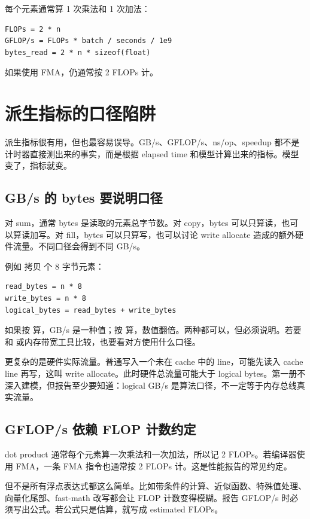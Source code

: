 每个元素通常算 1 次乘法和 1 次加法：

\begin{lstlisting}
FLOPs = 2 * n
GFLOP/s = FLOPs * batch / seconds / 1e9
bytes_read = 2 * n * sizeof(float)
\end{lstlisting}

如果使用 FMA，仍通常按 2 FLOPs 计。

\section{派生指标的口径陷阱}

派生指标很有用，但也最容易误导。GB/s、GFLOP/s、ns/op、speedup 都不是计时器直接测出来的事实，而是根据 elapsed time 和模型计算出来的指标。模型变了，指标就变。

\subsection{GB/s 的 bytes 要说明口径}

对 sum，通常 bytes 是读取的元素总字节数。对 copy，bytes 可以只算读，也可以算读加写。对 fill，bytes 可以只算写，也可以讨论 write allocate 造成的额外硬件流量。不同口径会得到不同 GB/s。

例如  拷贝  个 8 字节元素：

\begin{lstlisting}
read_bytes = n * 8
write_bytes = n * 8
logical_bytes = read_bytes + write_bytes
\end{lstlisting}

如果按  算，GB/s 是一种值；按  算，数值翻倍。两种都可以，但必须说明。若要和  或内存带宽工具比较，也要看对方使用什么口径。

更复杂的是硬件实际流量。普通写入一个未在 cache 中的 line，可能先读入 cache line 再写，这叫 write allocate。此时硬件总流量可能大于 logical bytes。第一册不深入建模，但报告至少要知道：logical GB/s 是算法口径，不一定等于内存总线真实流量。

\subsection{GFLOP/s 依赖 FLOP 计数约定}

dot product 通常每个元素算一次乘法和一次加法，所以记 2 FLOPs。若编译器使用 FMA，一条 FMA 指令也通常按 2 FLOPs 计。这是性能报告的常见约定。

但不是所有浮点表达式都这么简单。比如带条件的计算、近似函数、特殊值处理、向量化尾部、fast-math 改写都会让 FLOP 计数变得模糊。报告 GFLOP/s 时必须写出公式。若公式只是估算，就写成 estimated FLOPs。

